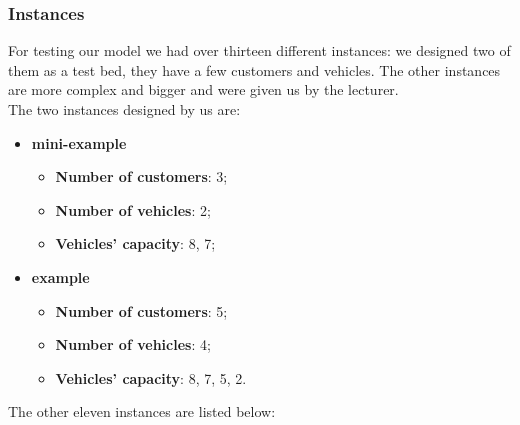 \documentclass[../main.tex]{subfiles}
\begin{document}
\subsubsection{Instances}
For testing our model we had over thirteen different instances: we designed two of them as a test bed, they have a few customers and vehicles.
The other instances are more complex and bigger and were given us by the lecturer.\\
The two instances designed by us are:
\begin{itemize}
    \item \textbf{mini-example}
        \begin{itemize}
            \item \textbf{Number of customers}: 3;
            \item \textbf{Number of vehicles}: 2;
            \item \textbf{Vehicles' capacity}: 8, 7;
        \end{itemize}

    \item \textbf{example}
        \begin{itemize}
            \item \textbf{Number of customers}: 5;
            \item \textbf{Number of vehicles}: 4;
            \item \textbf{Vehicles' capacity}: 8, 7, 5, 2.
        \end{itemize}
\end{itemize}
The other eleven instances are listed below:
\end{document}

